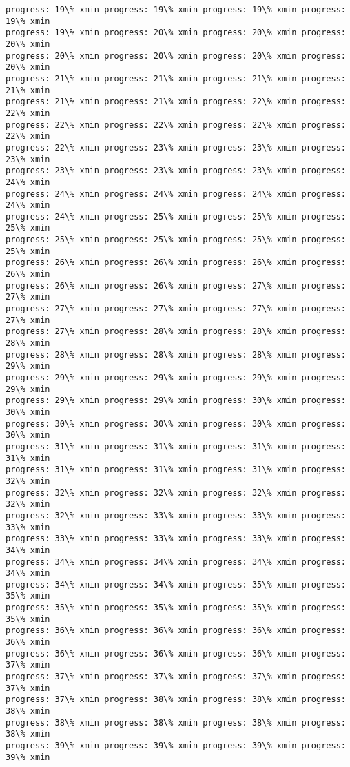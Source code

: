 \documentclass[11pt]{article}
\begin{document}
\begin{Verbatim}[commandchars=\\\{\}]
progress: 19\% xmin progress: 19\% xmin progress: 19\% xmin progress: 19\% xmin
progress: 19\% xmin progress: 20\% xmin progress: 20\% xmin progress: 20\% xmin
progress: 20\% xmin progress: 20\% xmin progress: 20\% xmin progress: 20\% xmin
progress: 21\% xmin progress: 21\% xmin progress: 21\% xmin progress: 21\% xmin
progress: 21\% xmin progress: 21\% xmin progress: 22\% xmin progress: 22\% xmin
progress: 22\% xmin progress: 22\% xmin progress: 22\% xmin progress: 22\% xmin
progress: 22\% xmin progress: 23\% xmin progress: 23\% xmin progress: 23\% xmin
progress: 23\% xmin progress: 23\% xmin progress: 23\% xmin progress: 24\% xmin
progress: 24\% xmin progress: 24\% xmin progress: 24\% xmin progress: 24\% xmin
progress: 24\% xmin progress: 25\% xmin progress: 25\% xmin progress: 25\% xmin
progress: 25\% xmin progress: 25\% xmin progress: 25\% xmin progress: 25\% xmin
progress: 26\% xmin progress: 26\% xmin progress: 26\% xmin progress: 26\% xmin
progress: 26\% xmin progress: 26\% xmin progress: 27\% xmin progress: 27\% xmin
progress: 27\% xmin progress: 27\% xmin progress: 27\% xmin progress: 27\% xmin
progress: 27\% xmin progress: 28\% xmin progress: 28\% xmin progress: 28\% xmin
progress: 28\% xmin progress: 28\% xmin progress: 28\% xmin progress: 29\% xmin
progress: 29\% xmin progress: 29\% xmin progress: 29\% xmin progress: 29\% xmin
progress: 29\% xmin progress: 29\% xmin progress: 30\% xmin progress: 30\% xmin
progress: 30\% xmin progress: 30\% xmin progress: 30\% xmin progress: 30\% xmin
progress: 31\% xmin progress: 31\% xmin progress: 31\% xmin progress: 31\% xmin
progress: 31\% xmin progress: 31\% xmin progress: 31\% xmin progress: 32\% xmin
progress: 32\% xmin progress: 32\% xmin progress: 32\% xmin progress: 32\% xmin
progress: 32\% xmin progress: 33\% xmin progress: 33\% xmin progress: 33\% xmin
progress: 33\% xmin progress: 33\% xmin progress: 33\% xmin progress: 34\% xmin
progress: 34\% xmin progress: 34\% xmin progress: 34\% xmin progress: 34\% xmin
progress: 34\% xmin progress: 34\% xmin progress: 35\% xmin progress: 35\% xmin
progress: 35\% xmin progress: 35\% xmin progress: 35\% xmin progress: 35\% xmin
progress: 36\% xmin progress: 36\% xmin progress: 36\% xmin progress: 36\% xmin
progress: 36\% xmin progress: 36\% xmin progress: 36\% xmin progress: 37\% xmin
progress: 37\% xmin progress: 37\% xmin progress: 37\% xmin progress: 37\% xmin
progress: 37\% xmin progress: 38\% xmin progress: 38\% xmin progress: 38\% xmin
progress: 38\% xmin progress: 38\% xmin progress: 38\% xmin progress: 38\% xmin
progress: 39\% xmin progress: 39\% xmin progress: 39\% xmin progress: 39\% xmin

\end{Verbatim}
\end{document}
